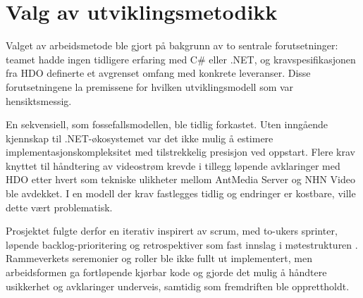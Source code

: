 \section{Valg av utviklingsmetodikk}
\label{sec:uvikling-modell}

Valget av arbeidsmetode ble gjort på bakgrunn av to sentrale forutsetninger: teamet hadde ingen tidligere erfaring med C\# eller .NET, og kravspesifikasjonen fra HDO definerte et avgrenset omfang med konkrete leveranser. Disse forutsetningene la premissene for hvilken utviklingsmodell som var hensiktsmessig.

En \gls{sekvensiell}, som \gls{fossefallsmodellen}, ble tidlig forkastet. Uten inngående kjennskap til .NET-økosystemet var det ikke mulig å estimere implementasjonskompleksitet med tilstrekkelig presisjon ved oppstart. Flere krav knyttet til håndtering av videostrøm krevde i tillegg løpende avklaringer med HDO etter hvert som tekniske ulikheter mellom AntMedia Server og NHN Video ble avdekket. I en modell der krav fastlegges tidlig og endringer er kostbare, ville dette vært problematisk.

Prosjektet fulgte derfor en \gls{iterativ} inspirert av \Gls{scrum}, med to-ukers sprinter, løpende backlog-prioritering og retrospektiver som fast innslag i møtestrukturen \cite{scrumguide}. Rammeverkets seremonier og roller ble ikke fullt ut implementert, men arbeidsformen ga fortløpende kjørbar kode og gjorde det mulig å håndtere usikkerhet og avklaringer underveis, samtidig som fremdriften ble opprettholdt.